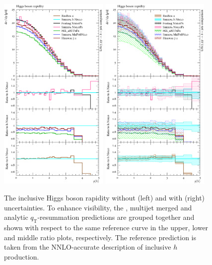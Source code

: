 \begin{figure}[t!]
  \centering
  \includegraphics[width=0.47\textwidth]{figures/hjetscomp_u_H_y.pdf}
  \hfill
  \includegraphics[width=0.47\textwidth]{figures/hjetscomp_H_y.pdf}
  \caption{\label{fig:hjetscomp:results:inclobs:hy}%
    The inclusive Higgs boson rapidity without (left) and with (right)
    uncertainties. To enhance visibility, the \hjetscompNNLOPS, multijet merged and
    analytic $q_\text{T}$-resummation predictions are grouped together and
    shown with respect to the same reference curve in the upper, lower
    and middle ratio plots, respectively. The reference prediction is
    taken from the NNLO-accurate description of inclusive $h$ production.}
\end{figure}

